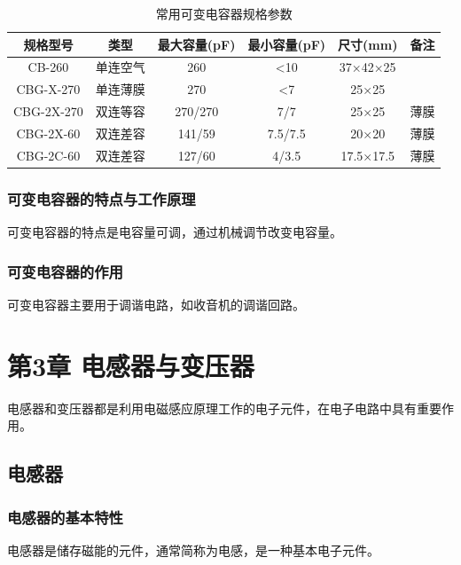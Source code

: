 \documentclass[12pt,UTF8]{ctexbook}
\begin{document}
\begin{table}[htbp]
	\centering
	\caption{常用可变电容器规格参数}
	\label{tab:variable_capacitor_specs}
	\begin{tabular}{|c|c|c|c|c|c|}
		\hline
		\textbf{规格型号} & \textbf{类型} & \textbf{最大容量(pF)} & \textbf{最小容量(pF)} & \textbf{尺寸(mm)} & \textbf{备注} \\
		\hline
		CB-260 & 单连空气 & 260 & <10 & 37×42×25 &  \\
		\hline
		CBG-X-270 & 单连薄膜 & 270 & <7 & 25×25 &  \\
		\hline
		CBG-2X-270 & 双连等容 & 270/270 & 7/7 & 25×25 & 薄膜 \\
		\hline
		CBG-2X-60 & 双连差容 & 141/59 & 7.5/7.5 & 20×20 & 薄膜 \\
		\hline
		CBG-2C-60 & 双连差容 & 127/60 & 4/3.5 & 17.5×17.5 & 薄膜 \\
		\hline
	\end{tabular}
\end{table}

\subsection{可变电容器的特点与工作原理}

可变电容器的特点是电容量可调，通过机械调节改变电容量。

\subsection{可变电容器的作用}

可变电容器主要用于调谐电路，如收音机的调谐回路。

\chapter{第3章 电感器与变压器}

电感器和变压器都是利用电磁感应原理工作的电子元件，在电子电路中具有重要作用。

\section{电感器}

\subsection{电感器的基本特性}

电感器是储存磁能的元件，通常简称为电感，是一种基本电子元件。
\end{document}
